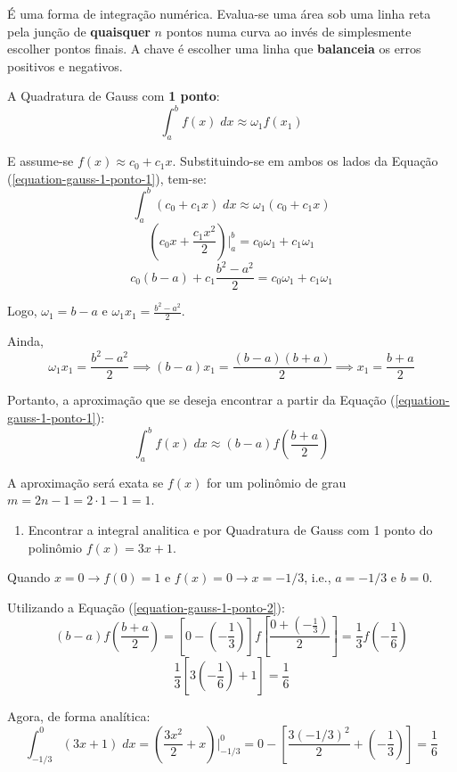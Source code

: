 É uma forma de integração numérica. Evalua-se uma área sob uma linha reta pela junção de \textbf{quaisquer} $n$ pontos numa curva ao invés de simplesmente escolher pontos finais. A chave é escolher uma linha que \textbf{balanceia} os erros positivos e negativos.

A Quadratura de Gauss com \textbf{1 ponto}:
\begin{equation}
	\label{equation-gauss-1-ponto-1}
	\int_{a}^b f(x)\;dx \approx \omega_1f(x_1)
\end{equation} 

E assume-se $f(x)\approx c_0+c_1x$. Substituindo-se em ambos os lados da Equação (\ref{equation-gauss-1-ponto-1}), tem-se:
\[ \int_{a}^b (c_0+c_1x)\;dx \approx \omega_1(c_0+c_1x) \]
\[ \left(c_0x+\frac{c_1x^2}{2}\right) \Bigg|_a^b = c_0\omega_1+c_1\omega_1 \]
\[ c_0(b-a)+c_1\frac{b^2-a^2}{2} = c_0\omega_1+c_1\omega_1 \]

Logo, $\omega_1=b-a$ e $\omega_1x_1=\displaystyle\frac{b^2-a^2}{2}$.

Ainda,
\[ \omega_1x_1=\displaystyle\frac{b^2-a^2}{2} \implies (b-a)x_1=\frac{(b-a)(b+a)}{2} \implies x_1=\frac{b+a}{2} \]

Portanto, a aproximação que se deseja encontrar a partir da Equação (\ref{equation-gauss-1-ponto-1}):
\begin{equation}
	\label{equation-gauss-1-ponto-2}
	\int_a^b f(x)\;dx \approx (b-a)f\left(\frac{b+a}{2}\right)
\end{equation}

A aproximação será exata se $f(x)$ for um polinômio de grau $m=2n-1=2\cdot1-1=1$.

\begin{enumerate}
	\item Encontrar a integral analitica e por Quadratura de Gauss com 1 ponto do polinômio $f(x)=3x+1$.
\end{enumerate}

Quando $x=0 \rightarrow f(0)=1$ e $f(x)=0\rightarrow x=-1/3$, i.e., $a=-1/3$ e $b=0$.

Utilizando a Equação (\ref{equation-gauss-1-ponto-2}):
\[ (b-a)f\left(\frac{b+a}{2}\right)= \left[0-\left(-\frac{1}{3}\right)\right] f\left[\frac{0+\left(-\frac{1}{3}\right)}{2}\right] =\frac{1}{3} f\left(-\frac{1}{6}\right) \]
\[ \frac{1}{3} \left[ 3\left(-\frac{1}{6}\right)+1 \right] = \frac{1}{6} \]

Agora, de forma analítica:
\[ \int_{-1/3}^0 (3x+1)\;dx = \left(\frac{3x^2}{2}+x\right)\Bigg|_{-1/3}^0 = 0-\left[ \frac{3(-1/3)^2}{2}+\left(-\frac{1}{3}\right) \right] =\frac{1}{6} \]

